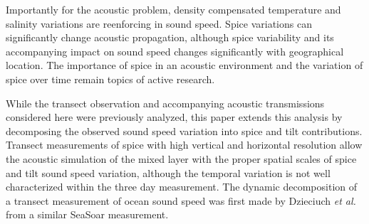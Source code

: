 \documentclass[preprint,NumberedRefs]{JASA}
\begin{document}
Importantly for the acoustic problem, density compensated temperature and salinity variations are reenforcing in sound speed. Spice variations can significantly change acoustic propagation, although spice variability and its accompanying impact on sound speed changes significantly with geographical location\citep{colosi12,colosi13,murat2021}. The importance of spice in an acoustic environment and the variation of spice over time remain topics of active research.




While the transect observation and accompanying acoustic transmissions considered here were previously analyzed\citep{colosi2020observations}, this paper extends this analysis by decomposing the observed sound speed variation into spice and tilt contributions. Transect measurements of spice with high vertical and horizontal resolution allow the acoustic simulation of the mixed layer with the proper spatial scales of spice and tilt sound speed variation, although the temporal variation is not well characterized within the three day measurement. The dynamic decomposition of a transect measurement of ocean sound speed was first made by Dzieciuch \emph{et al.}\citep{dzieciuch2004} from a similar SeaSoar measurement.
\end{document}

